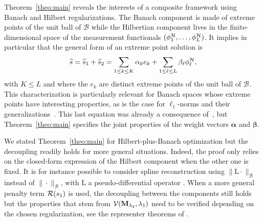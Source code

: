 \documentclass[12pt]{article}
\begin{document}
    Theorem~\ref{theo:main} reveals the interests of a composite framework using Banach and Hilbert regularizations. The Banach component is made of extreme points of the unit ball of $\mathcal{B}$
    while the Hilbertian component lives in the finite-dimensional space of the measurement functionals $(\phi^\mathcal{H}_1, \ldots, \phi^\mathcal{H}_L)$. It implies in particular that the general form of an extreme point solution is 
    \begin{equation*}
        \widehat{s} = \widehat{s}_1 + \widehat{s}_2 = \sum_{1 \leq k \leq K} \alpha_k e_k + \sum_{1 \leq \ell \leq L} \beta_\ell \phi^\mathcal{H}_{\ell},
    \end{equation*}
    with $K\leq L$ and where the $e_k$ are distinct extreme points of the unit ball of $\mathcal{B}$. 
    This characterization is particularly relevant for Banach spaces whose extreme points have interesting properties, as is the case for $\ell_1$-norms and their generalizations~\cite{chandrasekaran2012convex}.
    This last equation was already a consequence of~\cite[Theorem 2]{unser2022convex}, but Theorem~\ref{theo:main} specifies the joint properties of the weight vectors $\bm{\alpha}$ and $\bm{\beta}$.

    \begin{remark}
        We stated Theorem~\ref{theo:main} for Hilbert-plus-Banach optimization but the decoupling readily holds for more general situations. Indeed, the proof only relies on the closed-form expression of the Hilbert component when the other one is fixed.
        It is for instance possible to consider spline reconstruction using $\|\mathrm{L}\cdot\|_\mathcal{B}$ instead of $\|\cdot\|_\mathcal{B}$, with $\mathrm{L}$ a pseudo-differential operator \cite{unser2017splines}.
        When a more general penalty term $\mathcal{R}(s_1)$ is used, the decoupling between the components still holds but the properties that stem from $\mathcal{V}(\mathbf{M}_{\lambda_{2}}, \lambda_{1})$ need to be verified depending on the chosen regularization, see the representer theorems of \cite{boyer2019representer}.

    \end{remark}
\end{document}
